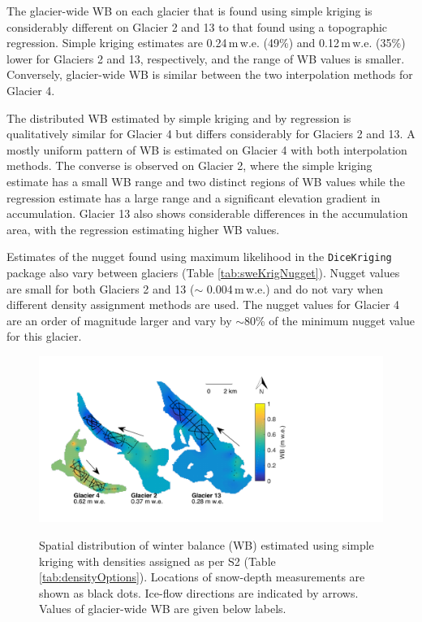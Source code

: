 \documentclass{sfuthesis}
\begin{document}
The glacier-wide WB on each glacier that is found using simple kriging is considerably different on Glacier 2 and 13 to that found using a topographic regression. Simple kriging estimates are 0.24\,m\,w.e. (49\%) and 0.12\,m\,w.e. (35\%) lower for Glaciers 2 and 13, respectively, and the range of WB values is smaller. Conversely, glacier-wide WB is similar between the two interpolation methods for Glacier 4.

The distributed WB estimated by simple kriging and by regression is qualitatively similar for Glacier 4 but differs considerably for Glaciers 2 and 13. A mostly uniform pattern of WB is estimated on Glacier 4 with both interpolation methods. The converse is observed on Glacier 2, where the simple kriging estimate has a small WB range and two distinct regions of WB values while the regression estimate has a large range and a significant elevation gradient in accumulation. Glacier 13 also shows considerable differences in the accumulation area, with the regression estimating higher WB values. 

Estimates of the nugget found using maximum likelihood in the \texttt{DiceKriging} package also vary between glaciers (Table \ref{tab:sweKrigNugget}). Nugget values are small for both Glaciers 2 and 13 ($\sim$ 0.004\,m\,w.e.) and do not vary when different density assignment methods are used. The nugget values for Glacier 4 are an order of magnitude larger and vary by $\sim$80\% of the minimum nugget value for this glacier. 

\begin{figure}
	\centering
	\includegraphics[width =0.9 \textwidth]{SK_map.pdf}\\
	\caption{Spatial distribution of winter balance (WB) estimated using simple kriging with densities assigned as per S2 (Table \ref{tab:densityOptions}). Locations of snow-depth measurements are shown as black dots. Ice-flow directions are indicated by arrows. Values of glacier-wide WB are given below labels.}
	\label{fig:sweKRIGING}
\end{figure}
\end{document}
